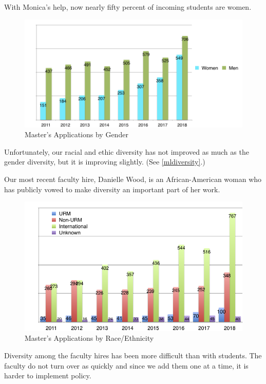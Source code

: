 With Monica's help, now nearly fifty percent of incoming students are women. 

\begin{figure}[h]
 \centering
 \includegraphics[width=1\textwidth]{pictures/mlgender.png}
 \caption{Master’s Applications by Gender}
 \label{mlgender}
\end{figure}

Unfortunately, our racial and ethic diversity has not improved as much as the gender diversity, but it is improving slightly. (See \autoref{mldiversity}.)

Our most recent faculty hire, Danielle Wood, is an African-American woman who has publicly vowed to make diversity an important part of her work.

\begin{figure}[h]
 \centering
 \includegraphics[width=1\textwidth]{pictures/2018mldiversity.png}
 \caption{Master’s Applications by Race/Ethnicity}
 \label{mldiversity}
\end{figure}

Diversity among the faculty hires has been more difficult than with students. The faculty do not turn over as quickly and since we add them one at a time, it is harder to implement policy.


